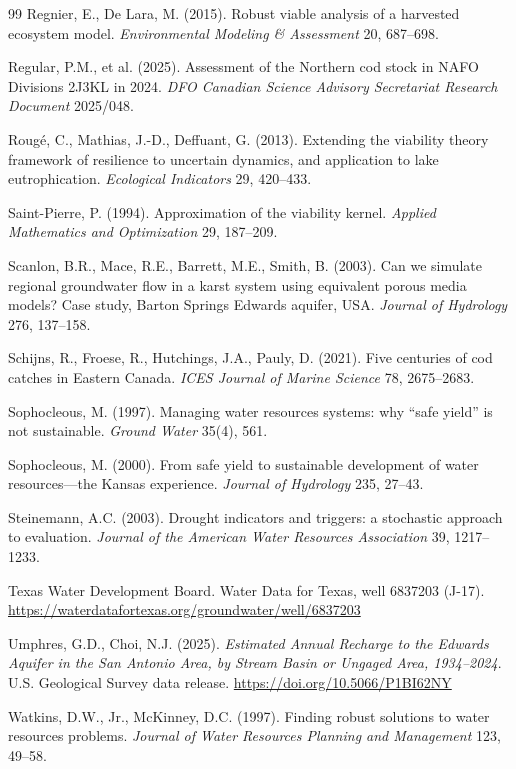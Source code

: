 \begin{thebibliography}{99}
 Regnier, E., De Lara, M. (2015). Robust viable analysis of a harvested ecosystem model. \emph{Environmental Modeling \& Assessment} 20, 687--698.

 Regular, P.M., et al. (2025). Assessment of the Northern cod stock in NAFO Divisions 2J3KL in 2024. \emph{DFO Canadian Science Advisory Secretariat Research Document} 2025/048.

 Roug\'e, C., Mathias, J.-D., Deffuant, G. (2013). Extending the viability theory framework of resilience to uncertain dynamics, and application to lake eutrophication. \emph{Ecological Indicators} 29, 420--433.

 Saint-Pierre, P. (1994). Approximation of the viability kernel. \emph{Applied Mathematics and Optimization} 29, 187--209.

 Scanlon, B.R., Mace, R.E., Barrett, M.E., Smith, B. (2003). Can we simulate regional groundwater flow in a karst system using equivalent porous media models? Case study, Barton Springs Edwards aquifer, USA. \emph{Journal of Hydrology} 276, 137--158.

 Schijns, R., Froese, R., Hutchings, J.A., Pauly, D. (2021). Five centuries of cod catches in Eastern Canada. \emph{ICES Journal of Marine Science} 78, 2675--2683.

 Sophocleous, M. (1997). Managing water resources systems: why ``safe yield'' is not sustainable. \emph{Ground Water} 35(4), 561.

 Sophocleous, M. (2000). From safe yield to sustainable development of water resources---the Kansas experience. \emph{Journal of Hydrology} 235, 27--43.

 Steinemann, A.C. (2003). Drought indicators and triggers: a stochastic approach to evaluation. \emph{Journal of the American Water Resources Association} 39, 1217--1233.

 Texas Water Development Board. Water Data for Texas, well 6837203 (J-17). \url{https://waterdatafortexas.org/groundwater/well/6837203}

 Umphres, G.D., Choi, N.J. (2025). \emph{Estimated Annual Recharge to the Edwards Aquifer in the San Antonio Area, by Stream Basin or Ungaged Area, 1934--2024}. U.S. Geological Survey data release. \url{https://doi.org/10.5066/P1BI62NY}

 Watkins, D.W., Jr., McKinney, D.C. (1997). Finding robust solutions to water resources problems. \emph{Journal of Water Resources Planning and Management} 123, 49--58.

\end{thebibliography}

